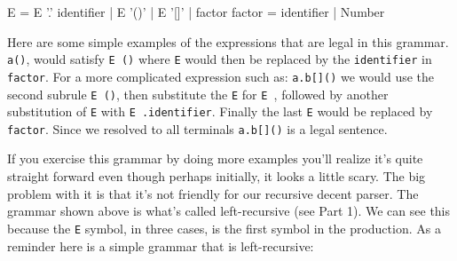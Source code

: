 

\begin{small}
\begin{code}
E       = E '.' identifier
        | E '()'
        | E '[]'
        | factor
factor  = identifier
        | Number
\end{code}
\end{small}

Here are some simple examples of the expressions that are legal in this grammar. {\tt a()}, would satisfy {\tt E \textquotesingle()\textquotesingle} where {\tt E} would then be replaced by the {\tt identifier} in {\tt factor}. For a more complicated expression such as: {\tt a.b[]()} we would use the second subrule {\tt E \textquotesingle()\textquotesingle}, then substitute the {\tt E} for {\tt E \textquotesingle[]\textquotesingle}, followed by another substitution of {\tt E} with {\tt E \textquotesingle.\textquotesingle identifier}. Finally the last {\tt E} would be replaced by {\tt factor}. Since we resolved to all terminals {\tt a.b[]()} is a legal sentence.

If you exercise this grammar by doing more examples you'll realize it's quite straight forward even though perhaps initially, it looks a little scary.  The big problem with it is that it's not friendly for our recursive decent parser. The grammar shown above is what's called left-recursive (see Part 1). We can see this because the {\tt E} symbol, in three cases, is the first symbol in the production.  As a reminder here is a simple grammar that is left-recursive:

